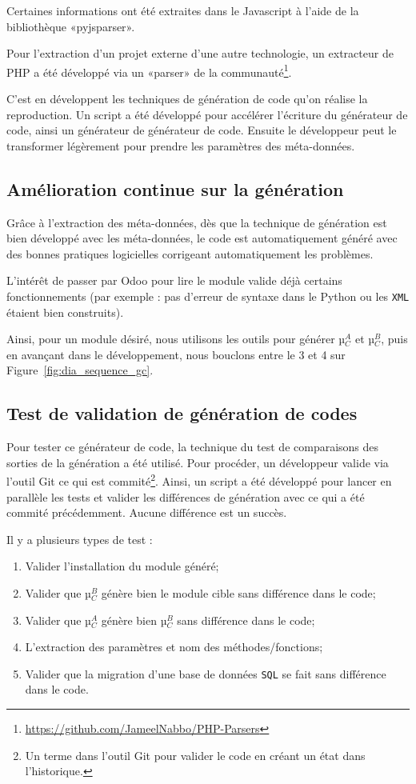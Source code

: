 Certaines informations ont été extraites dans le Javascript à l’aide de la bibliothèque «pyjsparser».

Pour l’extraction d'un projet externe d'une autre technologie, un extracteur de PHP a été développé via un «parser» de la communauté\footnote{\url{https://github.com/JameelNabbo/PHP-Parsers}}.

C'est en développent les techniques de génération de code qu'on réalise la reproduction. Un script a été développé pour accélérer l’écriture du générateur de code, ainsi un générateur de générateur de code. Ensuite le développeur peut le transformer légèrement pour prendre les paramètres des méta-données.

\subsection {Amélioration continue sur la génération}

Grâce à l’extraction des méta-données, dès que la technique de génération est bien développé avec les méta-données, le code est automatiquement généré avec des bonnes pratiques logicielles corrigeant automatiquement les problèmes.

L’intérêt de passer par Odoo pour lire le module valide déjà certains fonctionnements (par exemple : pas d’erreur de syntaxe dans le Python ou les \texttt{XML} étaient bien construits).

Ainsi, pour un module désiré, nous utilisons les outils pour générer µ$_C^A$ et µ$_C^B$, puis en avançant dans le développement, nous bouclons entre le 3 et 4 sur Figure~\ref{fig:dia_sequence_gc}.

\subsection {Test de validation de génération de codes}

Pour tester ce générateur de code, la technique du test de comparaisons des sorties de la génération a été utilisé. Pour procéder, un développeur valide via l'outil Git ce qui est commité\footnote{Un terme dans l'outil Git pour valider le code en créant un état dans l'historique.}. Ainsi, un script a été développé pour lancer en parallèle les tests et valider les différences de génération avec ce qui a été commité précédemment. Aucune différence est un succès.

Il y a plusieurs types de test : 
\begin{enumerate}
    \item Valider l’installation du module généré;
    \item Valider que µ$_C^B$ génère bien le module cible sans différence dans le code;
    \item Valider que µ$_C^A$ génère bien µ$_C^B$ sans différence dans le code;
    \item L’extraction des paramètres et nom des méthodes/fonctions;
    \item Valider que la migration d’une base de données \texttt{SQL} se fait sans différence dans le code.
\end{enumerate}


